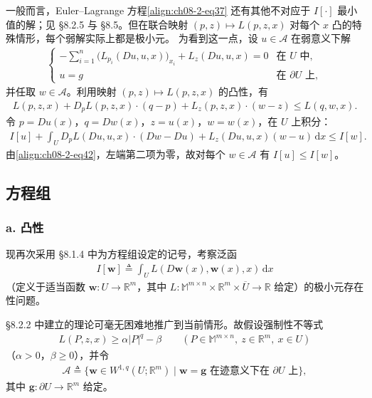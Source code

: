 \documentclass[../../main.tex]{subfiles}
\begin{document}
\begin{remark}\label{remark:ch08-2-2-凸联合弱解即极小}
一般而言，Euler--Lagrange 方程\eqref{align:ch08-2-eq37} 还有其他不对应于 $I[\cdot]$ 最小值的解；见 \S8.2.5 与 \S8.5。但在联合映射 $(p,z)\mapsto L(p,z,x)$ 对每个 $x$ 凸的特殊情形，每个弱解实际上都是极小元。
为看到这一点，设 $u\in\mathcal{A}$ 在弱意义下解
\begin{align}
\begin{cases}
-\sum_{i=1}^n\big(L_{p_i}(Du,u,x)\big)_{x_i}+L_z(Du,u,x)=0&\text{在 }U\text{ 中},\\
u=g&\text{在 }\partial U\text{ 上},
\end{cases}\label{align:ch08-2-eq42}
\end{align}
并任取 $w\in\mathcal{A}$。利用映射 $(p,z)\mapsto L(p,z,x)$ 的凸性，有
\begin{align*}
L(p,z,x)+D_pL(p,z,x)\cdot(q-p)+L_z(p,z,x)\cdot(w-z)\leqslant L(q,w,x).
\end{align*}
令 $p=Du(x)$，$q=Dw(x)$，$z=u(x)$，$w=w(x)$，在 $U$ 上积分：
\begin{align*}
I[u]+\int_U D_pL(Du,u,x)\cdot(Dw-Du)+L_z(Du,u,x)(w-u)\,\mathrm{d}x\leqslant I[w].
\end{align*}
由\eqref{align:ch08-2-eq42}，左端第二项为零，故对每个 $w\in\mathcal{A}$ 有 $I[u]\leqslant I[w]$。
\end{remark}

\subsection{方程组}\label{subsection:ch08-2-4-方程组}

\subsubsection*{a. 凸性}

现再次采用 \S8.1.4 中为方程组设定的记号，考察泛函
\begin{align*}
I[\mathbf{w}]\triangleq\int_U L(D\mathbf{w}(x),\mathbf{w}(x),x)\,\mathrm{d}x
\end{align*}
（定义于适当函数 $\mathbf{w}:U\to\mathbb{R}^m$，其中 $L:\mathbb{M}^{m\times n}\times\mathbb{R}^m\times\overline{U}\to\mathbb{R}$ 给定）的极小元存在性问题。

\S8.2.2 中建立的理论可毫无困难地推广到当前情形。故假设强制性不等式
\begin{align}
L(P,z,x)\geqslant\alpha|P|^q-\beta\qquad (P\in\mathbb{M}^{m\times n},\ z\in\mathbb{R}^m,\ x\in U)\label{align:ch08-2-eq43}
\end{align}
（$\alpha>0$，$\beta\geqslant 0$），并令
\begin{align*}
\mathcal{A}\triangleq\{\mathbf{w}\in W^{1,q}(U;\mathbb{R}^m)\mid \mathbf{w}=\mathbf{g}\text{ 在迹意义下在 }\partial U\text{ 上}\},
\end{align*}
其中 $\mathbf{g}:\partial U\to\mathbb{R}^m$ 给定。
\end{document}
